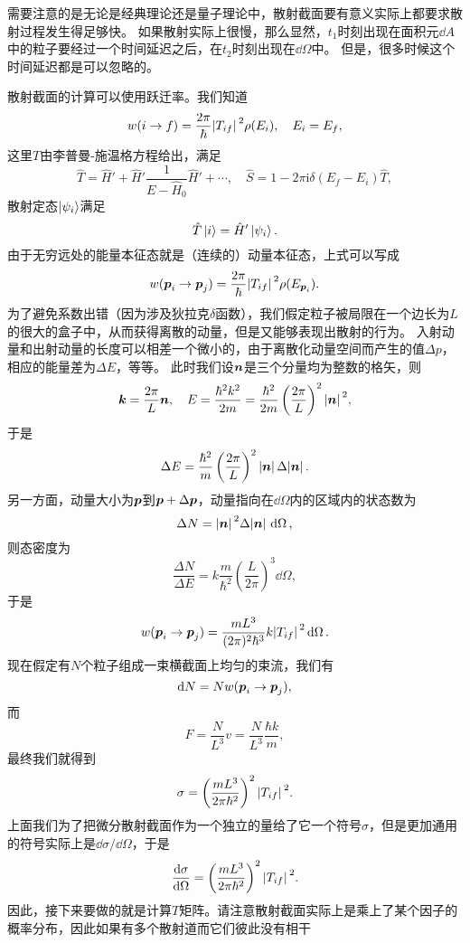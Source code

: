 \documentclass[UTF8, a4paper]{ctexart}
\newcommand*{\ii}{\mathrm{i}}
\begin{document}
需要注意的是无论是经典理论还是量子理论中，散射截面要有意义实际上都要求散射过程发生得足够快。
如果散射实际上很慢，那么显然，$t_1$时刻出现在面积元$\dd{A}$中的粒子要经过一个时间延迟之后，在$t_2$时刻出现在$\dd{\Omega}$中。
但是，很多时候这个时间延迟都是可以忽略的。

散射截面的计算可以使用跃迁率。我们知道
\[
    w(i \to f) = \frac{2\pi}{\hbar} \abs*{T_{if}}^2 \rho(E_i), \quad E_i = E_f,
\]
这里$T$由李普曼-施温格方程给出，满足
\[
    \hat{T} = \hat{H}' + \hat{H}' \frac{1}{E - \hat{H}_0} \hat{H}' + \cdots, \quad \hat{S} = 1 - 2 \pi \ii \delta(E_f - E_i) \hat{T},
\]
散射定态$\ket{\psi_i}$满足
\[
    \hat{T} \ket{i} = \hat{H}' \ket{\psi_i}.
\]
由于无穷远处的能量本征态就是（连续的）动量本征态，上式可以写成
\[
    w(\vb*{p}_i \to \vb*{p}_j) = \frac{2\pi}{\hbar} \abs*{T_{if}}^2 \rho(E_{\vb*{p}_i}).
\]
为了避免系数出错（因为涉及狄拉克$\delta$函数），我们假定粒子被局限在一个边长为$L$的很大的盒子中，从而获得离散的动量，但是又能够表现出散射的行为。
入射动量和出射动量的长度可以相差一个微小的，由于离散化动量空间而产生的值$\Delta p$，相应的能量差为$\Delta E$，等等。
此时我们设$\vb*{n}$是三个分量均为整数的格矢，则
\[
    \vb*{k} = \frac{2\pi}{L} \vb*{n}, \quad E = \frac{\hbar^2 k^2}{2m} = \frac{\hbar^2}{2m} \left( \frac{2\pi}{L} \right)^2 \abs*{\vb*{n}}^2,
\]
于是
\[
    \Delta E = \frac{\hbar^2}{m} \left( \frac{2\pi}{L} \right)^2 \abs*{\vb*{n}} \Delta \abs*{\vb*{n}}.
\]
另一方面，动量大小为$\vb*{p}$到$\vb*{p}+\Delta \vb*{p}$，动量指向在$\dd{\Omega}$内的区域内的状态数为
\[
    \Delta N = \abs*{\vb*{n}}^2 \Delta \abs*{\vb*{n}} \dd{\Omega},
\]
则态密度为
\[
    \frac{\Delta N}{\Delta E} = k \frac{m}{\hbar^2} \left( \frac{L}{2\pi} \right)^3 \dd{\Omega},
\]
于是
\begin{equation}
    w(\vb*{p}_i \to \vb*{p}_j) = \frac{mL^3}{(2\pi)^2 \hbar^3} k \abs*{T_{if}}^2 \dd{\Omega}.
\end{equation}
现在假定有$N$个粒子组成一束横截面上均匀的束流，我们有
\[
    \dd{N} = N w(\vb*{p}_i \to \vb*{p}_j),
\]
而
\[
    F = \frac{N}{L^3} v = \frac{N}{L^3} \frac{\hbar k}{m},
\]
最终我们就得到
\[
    \sigma = \left( \frac{m L^3}{2\pi \hbar^2} \right)^2 \abs*{T_{if}}^2.
\]
上面我们为了把微分散射截面作为一个独立的量给了它一个符号$\sigma$，但是更加通用的符号实际上是$\dd{\sigma}/\dd{\Omega}$，于是
\begin{equation}
    \dv{\sigma}{\Omega} = \left( \frac{m L^3}{2\pi \hbar^2} \right)^2 \abs*{T_{if}}^2.
    \label{eq:cross-section-and-t}
\end{equation}
因此，接下来要做的就是计算$T$矩阵。请注意散射截面实际上是乘上了某个因子的概率分布，因此如果有多个散射道而它们彼此没有相干
\end{document}
